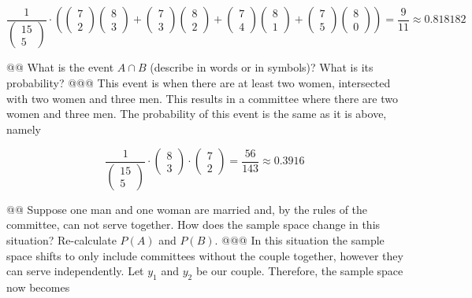 \documentclass[10pt]{article}
\begin{document}
\begin{easylist}[enumerate]
    \[
        \frac{1}{\begin{pmatrix}15\\5\end{pmatrix} } \cdot
            \left( \begin{pmatrix}7\\2\end{pmatrix}\begin{pmatrix}8\\3\end{pmatrix} +
            \begin{pmatrix}7\\3\end{pmatrix}\begin{pmatrix}8\\2\end{pmatrix} +
            \begin{pmatrix}7\\4\end{pmatrix}\begin{pmatrix}8\\1\end{pmatrix} +
            \begin{pmatrix}7\\5\end{pmatrix}\begin{pmatrix}8\\0\end{pmatrix} \right) =
        \boxed{\frac{9}{11} \approx 0.818182}
    \]

    @@ What is the event $A \cap B$ (describe in words or in symbols)? What is its probability?
    @@@ This event is when there are at least two women, intersected with two women and three men. This results in a committee where there are two women and three men. The probability of this event is the same as it is above, namely

        \[ \frac{1}{\begin{pmatrix}15\\5\end{pmatrix} } \cdot \begin{pmatrix}8\\3\end{pmatrix} \cdot \begin{pmatrix}7\\2\end{pmatrix} = \boxed{\frac{56}{143} \approx 0.3916} \]

    @@ Suppose one man and one woman are married and, by the rules of the committee, can not serve together. How does the sample space change in this situation? Re-calculate $P(A)$ and $P(B)$.
    @@@ In this situation the sample space shifts to only include committees without the couple together, however they can serve independently. Let $y_1$ and $y_2$ be our couple. Therefore, the sample space now becomes


\end{easylist}
\end{document}
